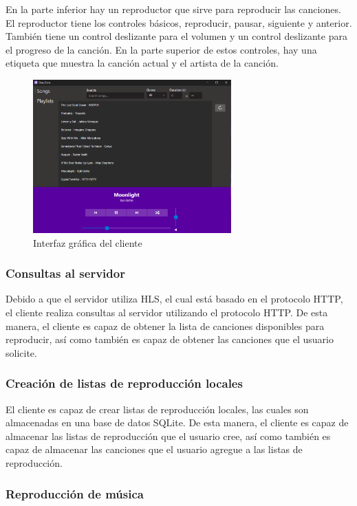 En la parte inferior hay un reproductor que sirve para reproducir las canciones.
El reproductor tiene los controles básicos, reproducir, pausar, siguiente y
anterior. También tiene un control deslizante para el volumen y un control
deslizante para el progreso de la canción. En la parte superior de estos
controles, hay una etiqueta que muestra la canción actual y el artista de la
canción.

\begin{figure}
    \centering
    \includegraphics[width=3in]{assets/app.png}
    \caption{Interfaz gráfica del cliente}
    \label{fig:app}
\end{figure}

\subsubsection{Consultas al servidor}

Debido a que el servidor utiliza HLS, el cual está basado en el protocolo HTTP,
el cliente realiza consultas al servidor utilizando el protocolo HTTP. De esta
manera, el cliente es capaz de obtener la lista de canciones disponibles para
reproducir, así como también es capaz de obtener las canciones que el usuario
solicite.

\subsubsection{Creación de listas de reproducción locales}

El cliente es capaz de crear listas de reproducción locales, las cuales son
almacenadas en una base de datos SQLite. De esta manera, el cliente es capaz de
almacenar las listas de reproducción que el usuario cree, así como también es
capaz de almacenar las canciones que el usuario agregue a las listas de
reproducción.

\subsubsection{Reproducción de música}

